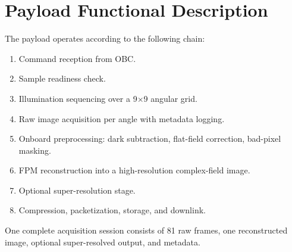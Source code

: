 \section{Payload Functional Description}

The payload operates according to the following chain:
\begin{enumerate}[leftmargin=1.5em]
    \item Command reception from OBC.
    \item Sample readiness check.
    \item Illumination sequencing over a 9$\times$9 angular grid.
    \item Raw image acquisition per angle with metadata logging.
    \item Onboard preprocessing: dark subtraction, flat-field correction, bad-pixel masking.
    \item FPM reconstruction into a high-resolution complex-field image.
    \item Optional super-resolution stage.
    \item Compression, packetization, storage, and downlink.
\end{enumerate}

One complete acquisition session consists of 81 raw frames, one reconstructed image, optional super-resolved output, and metadata.
